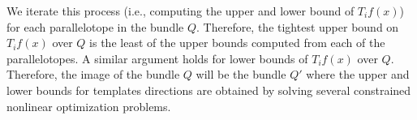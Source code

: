 We iterate this process (i.e., computing the upper and lower bound of $T_{i}f(x)$) for each parallelotope in the bundle $Q$.
%
%
Therefore, the tightest upper bound on $T_{i}f(x)$ over $Q$ is the least of the upper bounds computed from each of the parallelotopes.
%
A similar argument holds for lower bounds of $T_{i}f(x)$ over $Q$.
%
Therefore, the image of the bundle $Q$ will be the bundle $Q'$ where the upper and lower bounds for templates directions are obtained by solving several constrained nonlinear optimization problems.
